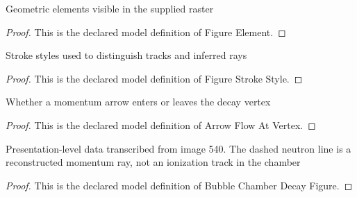 \begin{definition}
  \label{def:physics:phyx-mini-0540:phyxminiproblems-problemphyxmini0540-figureelement}
  Geometric elements visible in the supplied raster
\end{definition}
\begin{proof}
  This is the declared model definition of Figure Element.
\end{proof}
\begin{definition}
  \label{def:physics:phyx-mini-0540:phyxminiproblems-problemphyxmini0540-figurestrokestyle}
  Stroke styles used to distinguish tracks and inferred rays
\end{definition}
\begin{proof}
  This is the declared model definition of Figure Stroke Style.
\end{proof}
\begin{definition}
  \label{def:physics:phyx-mini-0540:phyxminiproblems-problemphyxmini0540-arrowflowatvertex}
  Whether a momentum arrow enters or leaves the decay vertex
\end{definition}
\begin{proof}
  This is the declared model definition of Arrow Flow At Vertex.
\end{proof}
\begin{definition}
  \label{def:physics:phyx-mini-0540:phyxminiproblems-problemphyxmini0540-bubblechamberdecayfigure}
  Presentation-level data transcribed from image 540. The dashed neutron line is a reconstructed momentum ray, not an ionization track in the chamber
\end{definition}
\begin{proof}
  This is the declared model definition of Bubble Chamber Decay Figure.
\end{proof}
